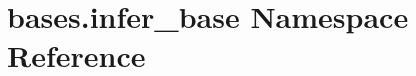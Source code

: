 \hypertarget{namespacebases_1_1infer__base}{}\section{bases.\+infer\+\_\+base Namespace Reference}
\label{namespacebases_1_1infer__base}

